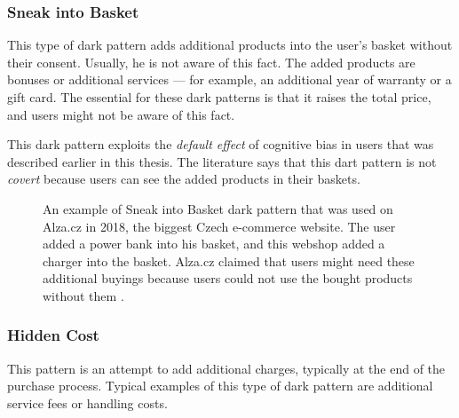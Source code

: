         \subsubsection{Sneak into Basket}
        This type of dark pattern adds additional products into the user's basket without their consent. Usually, he is not aware of this fact. The added products are bonuses or additional services — for example, an additional year of warranty or a gift card. The essential for these dark patterns is that it raises the total price, and users might not be aware of this fact. 
        
        This dark pattern exploits the \emph{default effect} of cognitive bias in users that was described earlier in this thesis. The literature says that this dart pattern is not \emph{covert} because users can see the added products in their baskets.

        \begin{figure}[ht]
            \centering
            \caption{An example of Sneak into Basket dark pattern that was used on Alza.cz in 2018, the biggest Czech e-commerce website. The user added a power bank into his basket, and this webshop added a charger into the basket. Alza.cz claimed that users might need these additional buyings because users could not use the bought products without them \cite{alza-sneak-into-basket-idnes}.}
            \label{fig:alza-sneak-into-basket}
        \end{figure}

        \subsubsection{Hidden Cost}
        This pattern is an attempt to add additional charges, typically at the end of the purchase process. Typical examples of this type of dark pattern are additional service fees or handling costs. 
        

